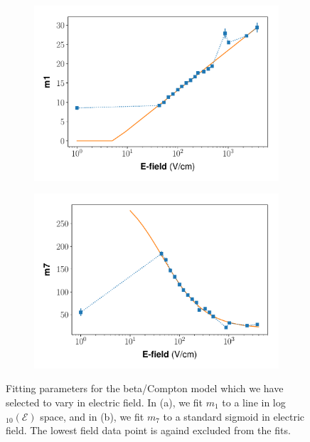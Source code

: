 \begin{figure}[!h]
\centering
\begin{subfigure}{0.5\linewidth}
\includegraphics[width=\linewidth]{Figures/Yields_fit_new/NEST_m1_fit_new.pdf}
\caption{}
\end{subfigure}%
\begin{subfigure}{0.5\linewidth}
\includegraphics[width=\linewidth]{Figures/Yields_fit_new/NEST_m7_fit_new.pdf}
\caption{}
\end{subfigure}
\caption{Fitting parameters for the beta/Compton model which we have selected to vary in electric field. In (a), we fit $m_1$ to a line in log$_{10}(\mathcal{E})$ space, and in (b), we fit $m_7$ to a standard sigmoid in electric field. The lowest field data point is againd excluded from the fits.}
\label{fig:betamod_varparms}
\end{figure}

